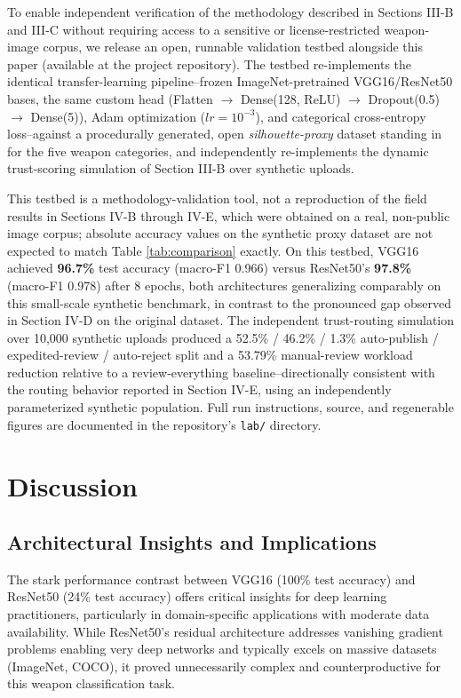 \documentclass[conference]{IEEEtran}
\begin{document}
To enable independent verification of the methodology described in Sections III-B and III-C without requiring access to a sensitive or license-restricted weapon-image corpus, we release an open, runnable validation testbed alongside this paper (available at the project repository). The testbed re-implements the identical transfer-learning pipeline--frozen ImageNet-pretrained VGG16/ResNet50 bases, the same custom head (Flatten $\rightarrow$ Dense(128, ReLU) $\rightarrow$ Dropout(0.5) $\rightarrow$ Dense(5)), Adam optimization ($lr=10^{-3}$), and categorical cross-entropy loss--against a procedurally generated, open \emph{silhouette-proxy} dataset standing in for the five weapon categories, and independently re-implements the dynamic trust-scoring simulation of Section III-B over synthetic uploads.

This testbed is a methodology-validation tool, not a reproduction of the field results in Sections IV-B through IV-E, which were obtained on a real, non-public image corpus; absolute accuracy values on the synthetic proxy dataset are not expected to match Table \ref{tab:comparison} exactly. On this testbed, VGG16 achieved \textbf{96.7\%} test accuracy (macro-F1 0.966) versus ResNet50's \textbf{97.8\%} (macro-F1 0.978) after 8 epochs, both architectures generalizing comparably on this small-scale synthetic benchmark, in contrast to the pronounced gap observed in Section IV-D on the original dataset. The independent trust-routing simulation over 10,000 synthetic uploads produced a 52.5\% / 46.2\% / 1.3\% auto-publish / expedited-review / auto-reject split and a 53.79\% manual-review workload reduction relative to a review-everything baseline--directionally consistent with the routing behavior reported in Section IV-E, using an independently parameterized synthetic population. Full run instructions, source, and regenerable figures are documented in the repository's \texttt{lab/} directory.

\section{Discussion}

\subsection{Architectural Insights and Implications}

The stark performance contrast between VGG16 (100\% test accuracy) and ResNet50 (24\% test accuracy) offers critical insights for deep learning practitioners, particularly in domain-specific applications with moderate data availability. While ResNet50's residual architecture addresses vanishing gradient problems enabling very deep networks and typically excels on massive datasets (ImageNet, COCO), it proved unnecessarily complex and counterproductive for this weapon classification task.
\end{document}
